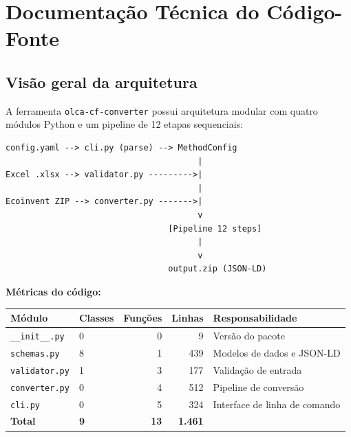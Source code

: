
\section{Documenta\c{c}\~ao T\'ecnica do C\'odigo-Fonte}
\label{sec:anexo2}

\subsection{Vis\~ao geral da arquitetura}

A ferramenta \texttt{olca-cf-converter} possui arquitetura modular com quatro m\'odulos Python e um pipeline de 12 etapas sequenciais:

\begin{lstlisting}
config.yaml --> cli.py (parse) --> MethodConfig
                                       |
Excel .xlsx --> validator.py --------->|
                                       |
Ecoinvent ZIP --> converter.py ------->|
                                       v
                                 [Pipeline 12 steps]
                                       |
                                       v
                                 output.zip (JSON-LD)
\end{lstlisting}

\textbf{M\'etricas do c\'odigo:}

\begin{table}[H]
\centering
\begin{tabular}{llrrl}
\toprule
\textbf{M\'odulo} & \textbf{Classes} & \textbf{Fun\c{c}\~oes} & \textbf{Linhas} & \textbf{Responsabilidade} \\
\midrule
\texttt{\_\_init\_\_.py} & 0 & 0 & 9 & Vers\~ao do pacote \\
\texttt{schemas.py} & 8 & 1 & 439 & Modelos de dados e JSON-LD \\
\texttt{validator.py} & 1 & 3 & 177 & Valida\c{c}\~ao de entrada \\
\texttt{converter.py} & 0 & 4 & 512 & Pipeline de convers\~ao \\
\texttt{cli.py} & 0 & 5 & 324 & Interface de linha de comando \\
\midrule
\textbf{Total} & \textbf{9} & \textbf{13} & \textbf{1.461} & \\
\bottomrule
\end{tabular}
\end{table}

